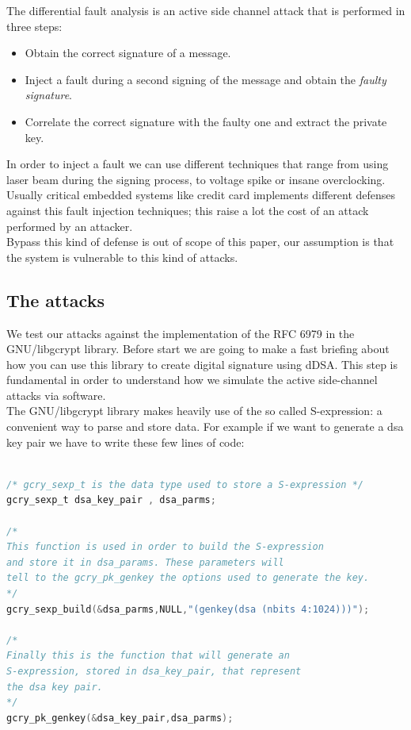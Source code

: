 \documentclass[11pt,english]{article}
\begin{document}
The differential fault analysis is an active side channel attack that is performed in three steps:
\begin{itemize}
\item Obtain the correct signature of a message.
\item Inject a fault during a second signing of the message and obtain the \textit{faulty signature}.
\item Correlate the correct signature with the faulty one and extract the private key.
\end{itemize}

In order to inject a fault we can use different techniques that range from using laser beam during the signing process, to voltage spike or insane overclocking.
\\Usually critical embedded systems like credit card implements different defenses against this fault injection techniques; this raise a lot the cost of an attack performed by an attacker. \\Bypass this kind of defense is out of scope of this paper, our assumption is that the system is vulnerable to this kind of attacks.

\subsection{The attacks}

We test our attacks against the implementation of the RFC 6979\cite{rfc} in the GNU/libgcrypt library\cite{lib}. 
Before start we are going to make a fast briefing about how you can use this library to create digital signature using dDSA. This step is fundamental in order to understand how we simulate the active side-channel attacks via software.\\
The GNU/libgcrypt library\cite{lib} makes heavily use of the so called S-expression\cite{sexp}: a convenient way to parse and store data. For example if we want to generate a dsa key pair we have to write these few lines of code:

\begin{lstlisting}[language=c]

/* gcry_sexp_t is the data type used to store a S-expression */
gcry_sexp_t dsa_key_pair , dsa_parms;

/* 
This function is used in order to build the S-expression 
and store it in dsa_params. These parameters will
tell to the gcry_pk_genkey the options used to generate the key.
*/
gcry_sexp_build(&dsa_parms,NULL,"(genkey(dsa (nbits 4:1024)))");

/*
Finally this is the function that will generate an 
S-expression, stored in dsa_key_pair, that represent 
the dsa key pair.
*/
gcry_pk_genkey(&dsa_key_pair,dsa_parms);
  
\end{lstlisting}
\end{document}
